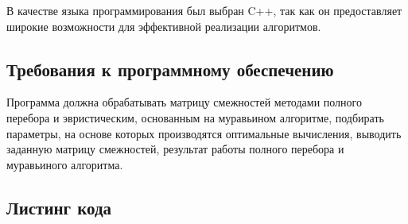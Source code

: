 \documentclass[a4paper,12pt]{article}
\begin{document}
		В качестве языка программирования был выбран C++, так как он предоставляет широкие возможности для эффективной реализации алгоритмов. 
	
	\begin{center}
	\end{center}
	\begin{center}
	        	\subsection{Требования к программному обеспечению}		
	\end{center}

			Программа должна обрабатывать матрицу смежностей методами полного перебора и эвристическим, основанным на муравьином алгоритме, подбирать параметры, на основе которых производятся оптимальные вычисления, выводить заданную матрицу смежностей, результат работы полного перебора и муравьиного алгоритма. 
	\begin{center}
	\end{center}
	\newpage			
    \begin{center}
        \subsection{Листинг кода}    
    \end{center}
        	
\end{document}
